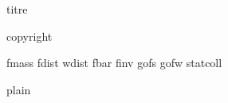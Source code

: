 \documentclass[12pt]{article}
\begin{document}
 {titre}

 {copyright}
\tableofcontents
\clearpage


 {fmass}
 {fdist}
 {wdist}
 {fbar}
 {finv}
 {gofs}
 {gofw}
 {statcoll}

 {plain}

\end{document}
